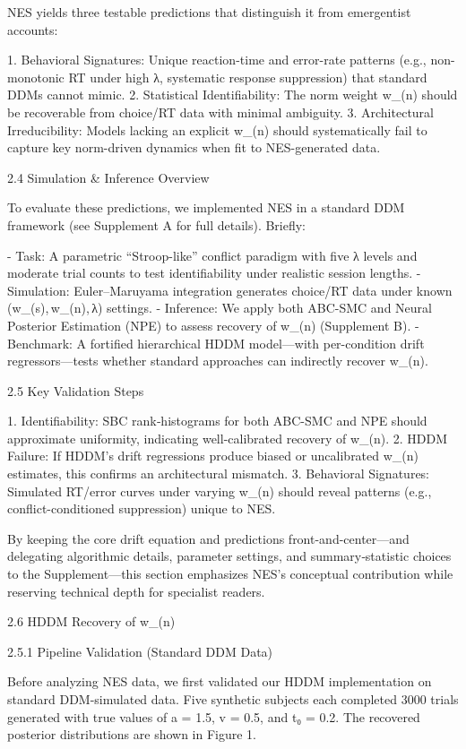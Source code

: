 NES yields three testable predictions that distinguish it from
emergentist accounts:

1.  Behavioral Signatures: Unique reaction-time and error-rate patterns
    (e.g., non-monotonic RT under high λ, systematic response
    suppression) that standard DDMs cannot mimic.
2.  Statistical Identifiability: The norm weight w_(n) should be
    recoverable from choice/RT data with minimal ambiguity.
3.  Architectural Irreducibility: Models lacking an explicit w_(n)
    should systematically fail to capture key norm-driven dynamics when
    fit to NES-generated data.

2.4 Simulation & Inference Overview

To evaluate these predictions, we implemented NES in a standard DDM
framework (see Supplement A for full details). Briefly:

- Task: A parametric “Stroop-like” conflict paradigm with five λ levels
  and moderate trial counts to test identifiability under realistic
  session lengths.
- Simulation: Euler–Maruyama integration generates choice/RT data under
  known (w_(s), w_(n), λ) settings.
- Inference: We apply both ABC-SMC and Neural Posterior Estimation (NPE)
  to assess recovery of w_(n) (Supplement B).
- Benchmark: A fortified hierarchical HDDM model—with per-condition
  drift regressors—tests whether standard approaches can indirectly
  recover w_(n).

2.5 Key Validation Steps

1.  Identifiability: SBC rank‐histograms for both ABC-SMC and NPE should
    approximate uniformity, indicating well-calibrated recovery of
    w_(n).
2.  HDDM Failure: If HDDM’s drift regressions produce biased or
    uncalibrated w_(n) estimates, this confirms an architectural
    mismatch.
3.  Behavioral Signatures: Simulated RT/error curves under varying w_(n)
    should reveal patterns (e.g., conflict-conditioned suppression)
    unique to NES.

By keeping the core drift equation and predictions front-and-center—and
delegating algorithmic details, parameter settings, and
summary‐statistic choices to the Supplement—this section emphasizes
NES’s conceptual contribution while reserving technical depth for
specialist readers.

2.6 HDDM Recovery of w_(n)

2.5.1 Pipeline Validation (Standard DDM Data)

Before analyzing NES data, we first validated our HDDM implementation on
standard DDM-simulated data. Five synthetic subjects each completed 3000
trials generated with true values of a = 1.5, v = 0.5, and t₀ = 0.2. The
recovered posterior distributions are shown in Figure 1.


